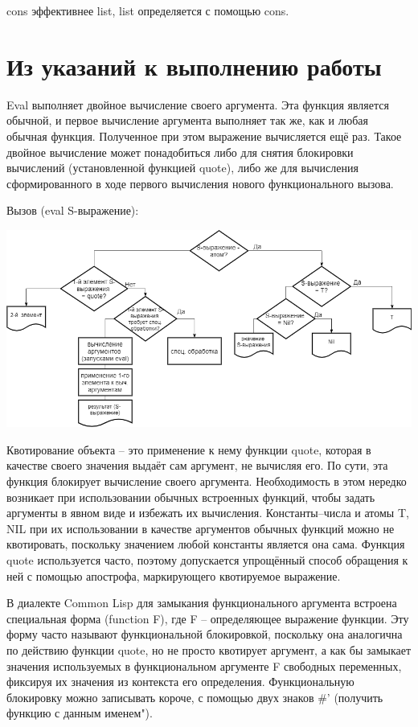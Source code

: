 \documentclass[12pt]{report}
\begin{document}
cons эффективнее list, list определяется с помощью cons.

 

\section*{Из указаний  к выполнению работы}

Eval выполняет двойное  вычисление своего аргумента. Эта функция является обычной, и первое  вычисление аргумента выполняет так же, как и любая обычная функция.  Полученное при этом выражение вычисляется ещё раз. Такое двойное  вычисление может понадобиться либо для снятия блокировки вычислений (установленной функцией quote), либо же для вычисления сформированного в ходе первого вычисления нового функционального вызова.

Вызов (eval S-выражение):

\includegraphics[scale=0.5]{img/eval}



Квотирование объекта -- это применение к нему функции quote, которая в качестве своего значения выдаёт сам аргумент, не вычисляя его. По сути, эта функция блокирует вычисление своего аргумента. Необходимость в этом нередко возникает при использовании обычных встроенных функций, чтобы задать аргументы в явном виде и избежать их вычисления. Константы–числа и атомы T, NIL при их  использовании в качестве аргументов обычных функций можно не  квотировать, поскольку значением любой константы является она сама. Функция quote используется часто, поэтому допускается упрощённый способ обращения к ней с помощью апострофа, маркирующего квотируемое выражение.


В диалекте Common Lisp для замыкания функционального аргумента встроена специальная форма (function F), где F – определяющее  выражение функции. Эту форму часто называют функциональной  блокировкой, поскольку она аналогична по действию функции quote, но  не просто квотирует аргумент, а как бы замыкает значения используемых  в функциональном аргументе F свободных переменных, фиксируя их значения из контекста его определения. Функциональную блокировку  можно записывать короче, с помощью двух знаков \#' (получить функцию с данным именем").
\end{document}
